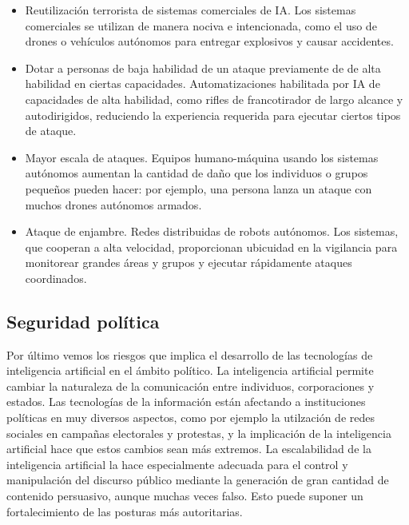 \documentclass[12pt,a4paper]{article}
\begin{document}
\begin{itemize}

\item Reutilización terrorista de sistemas comerciales de IA. Los sistemas comerciales se utilizan de manera nociva e intencionada, como el uso de drones o vehículos autónomos para entregar explosivos y causar accidentes.

\item Dotar a personas de baja habilidad de un ataque previamente de de alta habilidad en ciertas capacidades. Automatizaciones habilitada por IA de capacidades de alta habilidad, como rifles de francotirador de largo alcance y autodirigidos, reduciendo la experiencia requerida para ejecutar ciertos tipos de ataque.

\item Mayor escala de ataques. Equipos humano-máquina usando los sistemas autónomos aumentan la cantidad de daño que los individuos o grupos pequeños pueden hacer: por ejemplo, una persona lanza un ataque con muchos drones autónomos armados.

\item Ataque de enjambre. Redes distribuidas de robots autónomos. Los sistemas, que cooperan a alta velocidad, proporcionan ubicuidad en la vigilancia para monitorear grandes áreas y grupos y ejecutar rápidamente ataques coordinados.

\end {itemize}

\subsection{Seguridad política}

Por último vemos los riesgos que implica el desarrollo de las tecnologías de inteligencia artificial en el ámbito político. La inteligencia artificial permite cambiar la naturaleza de la comunicación entre individuos, corporaciones y estados. Las tecnologías de la información están afectando a instituciones políticas en muy diversos aspectos, como por ejemplo la utilzación de redes sociales en campañas electorales y protestas, y la implicación de la inteligencia artificial hace que estos cambios sean más extremos. La escalabilidad de la inteligencia artificial la hace especialmente adecuada para el control y manipulación del discurso público mediante la generación de gran cantidad de contenido persuasivo, aunque muchas veces falso. Esto puede suponer un fortalecimiento de las posturas más autoritarias.
\end{document}
